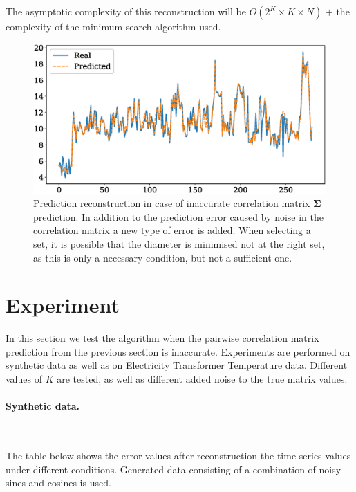 \documentclass{article}
\begin{document}
{The asymptotic complexity of this reconstruction will be $O(2^K \times K \times N)$ $+$ the complexity of the minimum search algorithm used.
\begin{figure}[H]
	\centering
	\includegraphics[width=\textwidth]{NonIdealRecovery.eps}
	\caption{Prediction reconstruction in case of inaccurate correlation matrix $\mathbf{\Sigma}$ prediction. In addition to the prediction error caused by noise in the correlation matrix a new type of error is added. When selecting a set, it is possible that the diameter is minimised not at the right set, as this is only a necessary condition, but not a sufficient one.}
	\label{fig:fig4}
\end{figure}

\section{Experiment}

In this section we test the algorithm when the pairwise correlation matrix prediction from the previous section is inaccurate. Experiments are performed on synthetic data as well as on Electricity Transformer Temperature \cite{zhou2021informer} data. Different values of $K$ are tested, as well as different added noise to the true matrix values.

\paragraph{Synthetic data.}\

The table below shows the error values after reconstruction the time series values under different conditions. Generated data consisting of a combination of noisy sines and cosines is used.

}
\end{document}
